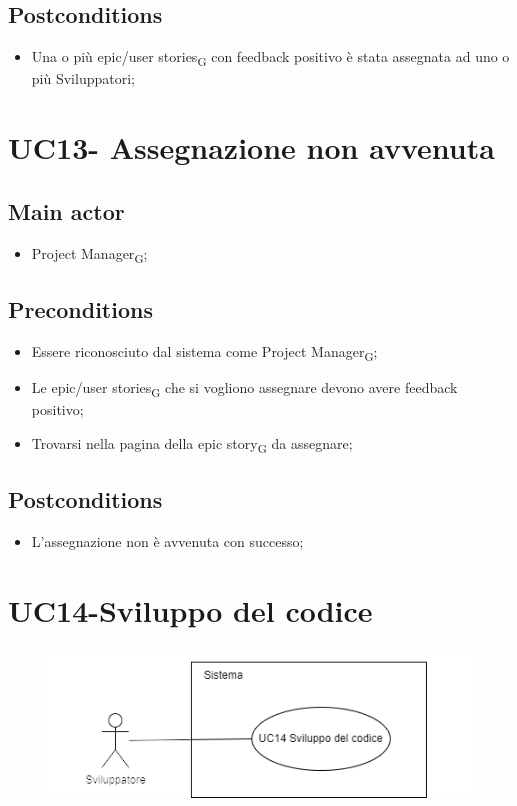 \documentclass{article}
\begin{document}
    \subsection*{Postconditions}
        \begin{itemize}
            \item Una o più epic/user stories\textsubscript{G} con feedback positivo è stata assegnata ad uno o più Sviluppatori;
        \end{itemize}

\section{UC13- Assegnazione non avvenuta}

       \subsection*{Main actor}
    \begin{itemize}
        \item Project Manager\textsubscript{G};
    \end{itemize}
    
    \subsection*{Preconditions}
        \begin{itemize}
            \item Essere riconosciuto dal sistema come Project Manager\textsubscript{G};
            \item Le epic/user stories\textsubscript{G} che si vogliono assegnare devono avere feedback positivo;
            \item Trovarsi nella pagina della epic story\textsubscript{G} da assegnare;
        \end{itemize}
        
    \subsection*{Postconditions}
        \begin{itemize}
            \item L'assegnazione non è avvenuta con successo;
        \end{itemize}
    
\section{UC14-Sviluppo del codice}
    \begin{figure}[h]
      \centering
      \includegraphics{./imgUML/UC14.png}
      \label{fig:immagine}
    \end{figure}
    
\end{document}
